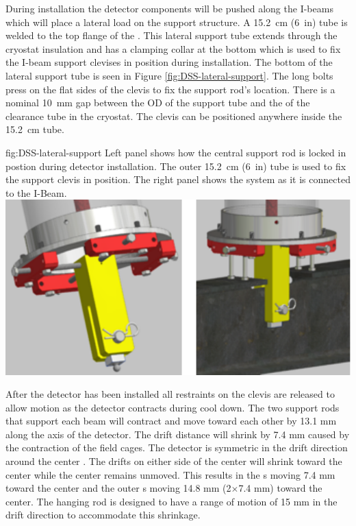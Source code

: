 During installation the detector components will be pushed along the  I-beams which will place a lateral load on the  support structure. 
A \SI{15.2}{cm} (\SI{6}{in})   tube is welded to the top flange of the  \fdth . 
This lateral support tube  extends through the cryostat insulation and has a clamping collar at the bottom which is used to fix the I-beam support clevises in position during installation. 
The bottom of the lateral support tube is seen in Figure \ref{fig:DSS-lateral-support}. 
The long bolts press on the flat sides of the clevis to fix the support rod's location. 
There is a nominal \SI{10}{mm} gap between the OD of the support tube and the  of the clearance tube in the cryostat. 
The clevis can be positioned anywhere inside the \SI{15.2}{cm} tube.




\begin{dunefigure}{fig:DSS-lateral-support}
  {Left panel shows how the central support rod is locked in postion during detector installation. The outer  \SI{15.2}{cm} (\SI{6}{in}) tube is used to fix the support clevis in position. The right panel shows the system as it is connected to the I-Beam.}
\includegraphics[width=.75\textwidth]{graphics/dss-lateral-support.pdf}
\end{dunefigure}

After the detector has been installed all restraints on the clevis are released to allow motion as the detector contracts during cool down.  The two support rods that support each  beam will contract and move toward each other by 13.1 mm along the axis of the detector.  
The drift distance will shrink by 7.4 mm caused by the contraction of the field cages.  The detector is symmetric in the drift direction around the center .  The drifts on either side of the center  will  shrink toward the center while the center  remains unmoved.  This results in the s moving 7.4 mm toward the center and the outer s moving 14.8 mm (2$\times$7.4 mm) toward the center.  The hanging rod is designed to have a range of motion of 15 mm in the drift direction to accommodate this shrinkage.




